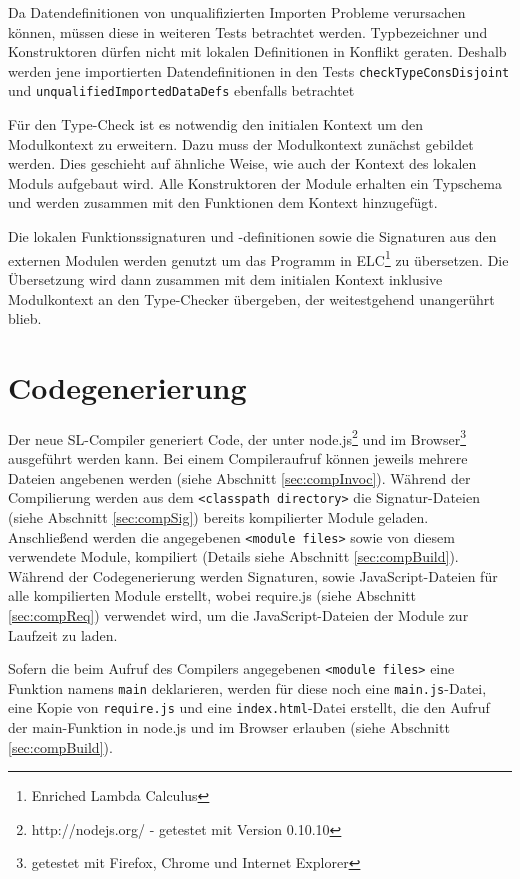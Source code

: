 \documentclass[runningheads]{llncs}
\begin{document}
Da Datendefinitionen von unqualifizierten Importen Probleme verursachen können, müssen diese in weiteren Tests betrachtet werden. Typbezeichner und Konstruktoren dürfen nicht mit lokalen Definitionen in Konflikt geraten. Deshalb werden jene importierten Datendefinitionen in den Tests \verb|checkTypeConsDisjoint| und \verb|unqualifiedImportedDataDefs| ebenfalls betrachtet

Für den Type-Check ist es notwendig den initialen Kontext um den Modulkontext zu erweitern. Dazu muss der Modulkontext zunächst gebildet werden. Dies geschieht auf ähnliche Weise, wie auch der Kontext des lokalen Moduls aufgebaut wird. Alle Konstruktoren der Module erhalten ein Typschema und werden zusammen mit den Funktionen dem Kontext hinzugefügt.

Die lokalen Funktionssignaturen und -definitionen sowie die Signaturen aus den externen Modulen werden genutzt um das Programm in ELC\footnote{Enriched Lambda Calculus} zu übersetzen. Die Übersetzung wird dann zusammen mit dem initialen Kontext inklusive Modulkontext an den Type-Checker übergeben, der weitestgehend unangerührt blieb.

\section{Codegenerierung}
\label{sec:codegen}

Der neue SL-Compiler generiert Code, der unter node.js\footnote{http://nodejs.org/ - getestet mit Version 0.10.10} und im Browser\footnote{getestet mit Firefox, Chrome und Internet Explorer} ausgeführt werden kann. Bei einem Compileraufruf können jeweils mehrere
Dateien angebenen werden (siehe Abschnitt \ref{sec:compInvoc}). Während
der Compilierung werden aus dem \texttt{<classpath directory>} die
Signatur-Dateien (siehe Abschnitt \ref{sec:compSig}) bereits
kompilierter Module geladen. Anschließend werden die angegebenen
\texttt{<module files>} sowie von diesem verwendete Module, kompiliert
(Details siehe Abschnitt \ref{sec:compBuild}). Während der Codegenerierung
werden Signaturen, sowie JavaScript-Dateien für alle
kompilierten Module erstellt, wobei require.js (siehe Abschnitt
\ref{sec:compReq}) verwendet wird, um die JavaScript-Dateien der
Module zur Laufzeit zu laden.

Sofern die beim Aufruf des Compilers angegebenen
\texttt{<module files>} eine Funktion namens
\texttt{main} deklarieren, werden für diese noch eine
\texttt{main.js}-Datei, eine Kopie von \texttt{require.js} und eine
\texttt{index.html}-Datei erstellt,
die den Aufruf der main-Funktion in node.js und im Browser erlauben
(siehe Abschnitt \ref{sec:compBuild}).
\end{document}
